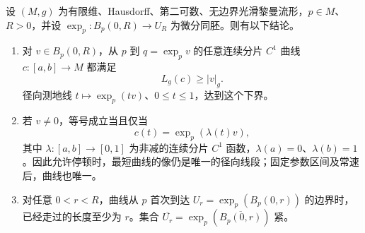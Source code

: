 \begin{proposition}\label{g3:prop:normal-radial-minimality}
	设 \((M,g)\) 为有限维、Hausdorff、第二可数、无边界光滑黎曼流形，\(p\in M\)、\(R>0\)，并设 \(\exp_p:B_p(0,R)\to U_R\) 为微分同胚。则有以下结论。
	\begin{enumerate}
		\item 对 \(v\in B_p(0,R)\)，从 \(p\) 到 \(q=\exp_pv\) 的任意连续分片 \(C^1\) 曲线 \(c:[a,b]\to M\) 都满足
		\[
			L_g(c)\ge |v|_g.
		\]
		径向测地线 \(t\mapsto\exp_p(tv)\)、\(0\le t\le1\)，达到这个下界。
		\item 若 \(v\ne0\)，等号成立当且仅当
		\[
			c(t)=\exp_p(\lambda(t)v),
		\]
		其中 \(\lambda:[a,b]\to[0,1]\) 为非减的连续分片 \(C^1\) 函数，\(\lambda(a)=0\)、\(\lambda(b)=1\)。因此允许停顿时，最短曲线的像仍是唯一的径向线段；固定参数区间及常速后，曲线也唯一。
		\item 对任意 \(0<r<R\)，曲线从 \(p\) 首次到达 \(U_r=\exp_p(B_p(0,r))\) 的边界时，已经走过的长度至少为 \(r\)。集合 \(\overline{U_r}=\exp_p(\overline{B_p(0,r)})\) 紧。
	\end{enumerate}
\end{proposition}
